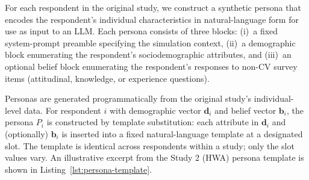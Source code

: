 \documentclass[12pt]{article}
\begin{document}
For each respondent in the original study, we construct a synthetic persona that encodes the respondent's individual characteristics in natural-language form for use as input to an LLM. Each persona consists of three blocks: (i)~a fixed system-prompt preamble specifying the simulation context, (ii)~a demographic block enumerating the respondent's sociodemographic attributes, and (iii)~an optional belief block enumerating the respondent's responses to non-CV survey items (attitudinal, knowledge, or experience questions).

Personas are generated programmatically from the original study's individual-level data. For respondent $i$ with demographic vector $\mathbf{d}_i$ and belief vector $\mathbf{b}_i$, the persona $P_i$ is constructed by template substitution: each attribute in $\mathbf{d}_i$ and (optionally) $\mathbf{b}_i$ is inserted into a fixed natural-language template at a designated slot. The template is identical across respondents within a study; only the slot values vary. An illustrative excerpt from the Study 2 (HWA) persona template is shown in Listing~\ref{lst:persona-template}.
\end{document}
